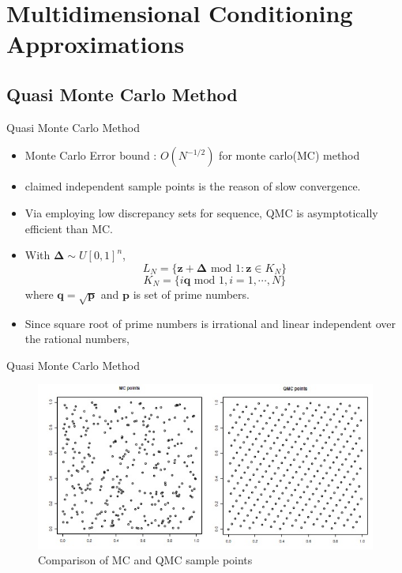 \section{Multidimensional Conditioning Approximations}

\subsection{Quasi Monte Carlo Method}\label{subsec:qmc}

\begin{frame}{Quasi Monte Carlo Method}
\begin{itemize}
	\item Monte Carlo Error bound : $O(N^{-1/2})$ for monte carlo(MC) method
	\item \citet{genz2009computation} claimed independent sample points is the reason of slow convergence.
	\item Via employing low discrepancy sets for sequence, QMC is asymptotically efficient than MC.
	\item With $\boldsymbol{\Delta}\sim U[0,1]^n$,
	$$L_N=\{\mathbf{z}+\boldsymbol{\Delta}\text{ mod }1:\mathbf{z}\in K_N\}$$
	$$K_N=\{i\mathbf{q}\text{ mod }1,i=1,\cdots,N\}$$
	where $\mathbf{q}=\sqrt{\mathbf{p}}$ and $\mathbf{p}$ is set of prime numbers.
	\item Since square root of prime numbers is irrational and linear independent over the rational numbers, 
\end{itemize}
\end{frame}

\begin{frame}{Quasi Monte Carlo Method}
\begin{figure}[ht]
	\centering
	\includegraphics[width=\linewidth]{figs/QMC.jpg}
	\caption{Comparison of MC and QMC sample points\citep{genz2009computation}}
	\label{fig:QMC}
\end{figure}
\end{frame}

